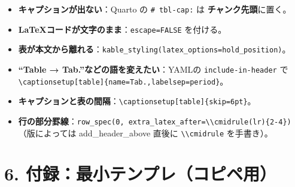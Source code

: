 \documentclass[
  japanese,
  letterpaper,
  DIV=11,
  numbers=noendperiod]{scrartcl}
\providecommand{\tightlist}{%
  \setlength{\itemsep}{0pt}\setlength{\parskip}{0pt}}
\begin{document}
\begin{itemize}
\tightlist
\item
  \textbf{キャプションが出ない}：Quarto の
  \texttt{\#\textbar{}\ tbl-cap:} は \textbf{チャンク先頭}に置く。\\
\item
  \textbf{LaTeXコードが文字のまま}：\texttt{escape=FALSE} を付ける。\\
\item
  \textbf{表が本文から離れる}：\texttt{kable\_styling(latex\_options=\textquotesingle{}hold\_position\textquotesingle{})}。\\
\item
  \textbf{``Table → Tab.''などの語を変えたい}：YAMLの
  \texttt{include-in-header} で
  \texttt{\textbackslash{}captionsetup{[}table{]}\{name=Tab.,labelsep=period\}}。\\
\item
  \textbf{キャプションと表の間隔}：\texttt{\textbackslash{}captionsetup{[}table{]}\{skip=6pt\}}。\\
\item
  \textbf{行の部分罫線}：\texttt{row\_spec(0,\ extra\_latex\_after=\textquotesingle{}\textbackslash{}\textbackslash{}cmidrule(lr)\{2-4\}\textquotesingle{})}（版によっては
  add\_header\_above 直後に
  \texttt{\textbackslash{}\textbackslash{}cmidrule} を手書き）。
\end{itemize}

\section{6.
付録：最小テンプレ（コピペ用）}\label{ux4ed8ux9332ux6700ux5c0fux30c6ux30f3ux30d7ux30ecux30b3ux30d4ux30daux7528}

\begin{table}

\caption{\label{tbl-template}最小テンプレ}


\end{table}%
\end{document}
